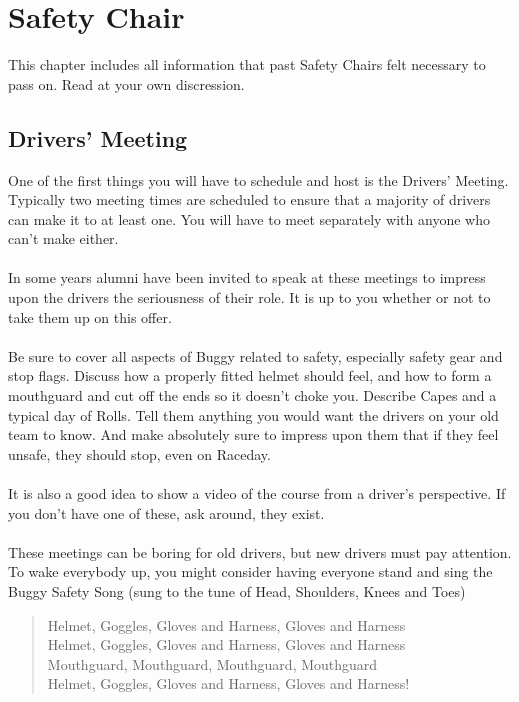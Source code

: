 \chapter{Safety Chair}
\label{ch:Safety}

This chapter includes all information that past Safety Chairs felt necessary
to pass on. Read at your own discression.

\section{Drivers' Meeting}
\label{sec:Driver's Meeting}
One of the first things you will have to schedule and host is the Drivers'
Meeting. Typically two meeting times are scheduled to ensure that a majority
of drivers can make it to at least one. You will have to meet separately
with anyone who can't make either.
\\\\
In some years alumni have been invited to speak at these meetings to impress
upon the drivers the seriousness of their role. It is up to you whether
or not to take them up on this offer.
\\\\
Be sure to cover all aspects of Buggy related to safety, especially safety
gear and stop flags. Discuss how a properly fitted helmet should feel, and how
to form a mouthguard and cut off the ends so it doesn't choke you. Describe
Capes and a typical day of Rolls. Tell them anything you would want the
drivers on your old team to know. And make absolutely sure to impress upon
them that if they feel unsafe, they should stop, even on Raceday.
\\\\
It is also a good idea to show a video of the course
from a driver's perspective. If you don't have one of these, ask around,
they exist.
\\\\
These meetings can be boring for old drivers, but new drivers must pay
attention. To wake everybody up, you might consider having everyone stand and
sing the Buggy Safety Song (sung to the tune of Head, Shoulders, Knees and 
Toes)
\begin{quote}
Helmet, Goggles, Gloves and Harness, Gloves and Harness\\
Helmet, Goggles, Gloves and Harness, Gloves and Harness\\
Mouthguard, Mouthguard, Mouthguard, Mouthguard\\
Helmet, Goggles, Gloves and Harness, Gloves and Harness!\\
\end{quote}
